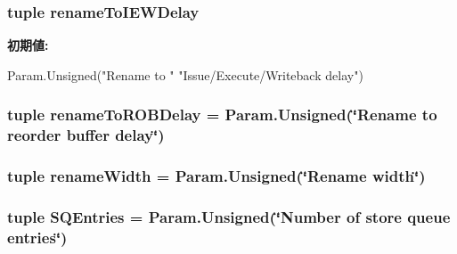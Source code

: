 \label{classOzoneCPU_1_1DerivOzoneCPU_a8aaf587e0c65d740c68328f587f36b97}
\hypertarget{classOzoneCPU_1_1DerivOzoneCPU_acdec10386abd09a4724775d533fc65d4}{
\subsubsection[{renameToIEWDelay}]{\setlength{\rightskip}{0pt plus 5cm}tuple {\bf renameToIEWDelay}}}
\label{classOzoneCPU_1_1DerivOzoneCPU_acdec10386abd09a4724775d533fc65d4}
{\bfseries 初期値:}
\begin{DoxyCode}
Param.Unsigned("Rename to "
               "Issue/Execute/Writeback delay")
\end{DoxyCode}
\hypertarget{classOzoneCPU_1_1DerivOzoneCPU_a1c17c9a7d634b03c7c2b7c0ba0ca21b9}{
\subsubsection[{renameToROBDelay}]{\setlength{\rightskip}{0pt plus 5cm}tuple {\bf renameToROBDelay} = Param.Unsigned(\char`\"{}Rename to reorder buffer delay\char`\"{})}}
\label{classOzoneCPU_1_1DerivOzoneCPU_a1c17c9a7d634b03c7c2b7c0ba0ca21b9}
\hypertarget{classOzoneCPU_1_1DerivOzoneCPU_a6500ae95e23f48433d63280c42925a31}{
\subsubsection[{renameWidth}]{\setlength{\rightskip}{0pt plus 5cm}tuple {\bf renameWidth} = Param.Unsigned(\char`\"{}Rename {\bf width}\char`\"{})}}
\label{classOzoneCPU_1_1DerivOzoneCPU_a6500ae95e23f48433d63280c42925a31}
\hypertarget{classOzoneCPU_1_1DerivOzoneCPU_a910857438278a89a287832cf7087317b}{
\subsubsection[{SQEntries}]{\setlength{\rightskip}{0pt plus 5cm}tuple {\bf SQEntries} = Param.Unsigned(\char`\"{}Number of store queue entries\char`\"{})}}
